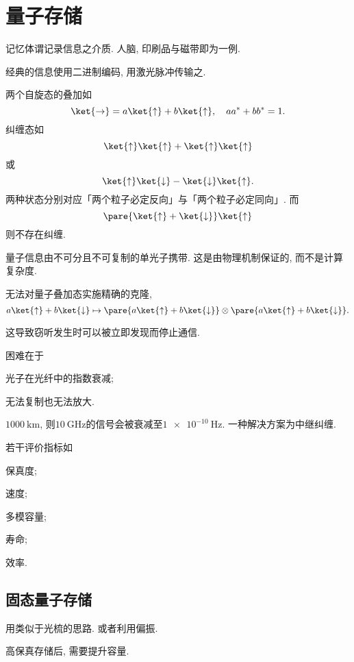 \documentclass{ctexart}
\begin{document}
\section{量子存储} %
\label{sec:量子存储}

记忆体谓记录信息之介质. 人脑, 印刷品与磁带即为一例.
\par
经典的信息使用二进制编码, 用激光脉冲传输之.
\par
两个自旋态的叠加如
\[ \ket{\rightarrow} = a\ket{\uparrow} + b\ket{\uparrow},\quad aa^* + bb^* = 1. \]
纠缠态如
\[ \ket{\uparrow}\ket{\uparrow} + \ket{\uparrow}\ket{\uparrow} \]
或
\[ \ket{\uparrow}\ket{\downarrow} - \ket{\downarrow}\ket{\uparrow}. \]
两种状态分别对应「两个粒子必定反向」与「两个粒子必定同向」. 而
\[ \pare{\ket{\uparrow} + \ket{\downarrow}}\ket{\uparrow} \]
则不存在纠缠.
\par
量子信息由不可分且不可复制的单光子携带. 这是由物理机制保证的, 而不是计算复杂度.
\begin{theorem}[不可复制定理]
    无法对量子叠加态实施精确的克隆,
    \[ a\ket{\uparrow} + b\ket{\downarrow} \mapsto \pare{a\ket{\uparrow} + b\ket{\downarrow}}\otimes\pare{a\ket{\uparrow} + b\ket{\downarrow}}. \]
\end{theorem}
这导致窃听发生时可以被立即发现而停止通信.
\par
困难在于
\begin{cenum}
    \item 光子在光纤中的指数衰减;
    \item 无法复制也无法放大.
\end{cenum}
$\SI{1000}{\kilo\meter}$, 则$\SI{10}{\giga\hertz}$的信号会被衰减至$\SI{1e-10}{\hertz}$. 一种解决方案为中继纠缠.
\par
若干评价指标如
\begin{cenum}
    \item 保真度;
    \item 速度;
    \item 多模容量;
    \item 寿命;
    \item 效率.
\end{cenum}

\subsection{固态量子存储} %
\label{sub:固态量子存储}

用类似于光梳的思路. 或者利用偏振.
\par
高保真存储后, 需要提升容量. 


\end{document}
